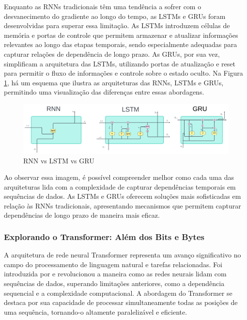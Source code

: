 Enquanto as RNNs tradicionais têm uma tendência a sofrer com o desvanecimento do gradiente ao longo do tempo, as LSTMs e GRUs foram desenvolvidas para superar essa limitação. As LSTMs introduzem células de memória e portas de controle que permitem armazenar e atualizar informações relevantes ao longo das etapas temporais, sendo especialmente adequadas para capturar relações de dependência de longo prazo. As GRUs, por sua vez, simplificam a arquitetura das LSTMs, utilizando portas de atualização e reset para permitir o fluxo de informações e controle sobre o estado oculto.
Na Figura \ref{fig:rnn-vs-lstm-vs-gru-1024x308}, há um esquema que ilustra as arquiteturas das RNNs, LSTMs e GRUs, permitindo uma visualização das diferenças entre essas abordagens.

\begin{figure}[H]
	\centering
	\caption{RNN vs LSTM vs GRU}
	\label{fig:rnn-vs-lstm-vs-gru-1024x308}
	\includegraphics[width=1\linewidth]{Apendices/Figuras/modelagem-24h/RNN-vs-LSTM-vs-GRU-1024x308}
	
\end{figure}


Ao observar essa imagem, é possível compreender melhor como cada uma das arquiteturas lida com a complexidade de capturar dependências temporais em sequências de dados. As LSTMs e GRUs oferecem soluções mais sofisticadas em relação às RNNs tradicionais, apresentando mecanismos que permitem capturar dependências de longo prazo de maneira mais eficaz.

\subsubsection{Explorando o Transformer: Al\'em dos Bits e Bytes}

A arquitetura de rede neural Transformer representa um avanço significativo no campo do processamento de linguagem natural e tarefas relacionadas. Foi introduzida por \cite{vaswani2017attention} e revolucionou a maneira como as redes neurais lidam com sequências de dados, superando limitações anteriores, como a dependência sequencial e a complexidade computacional. A abordagem do Transformer se destaca por sua capacidade de processar simultaneamente todas as posições de uma sequência, tornando-o altamente paralelizável e eficiente.

